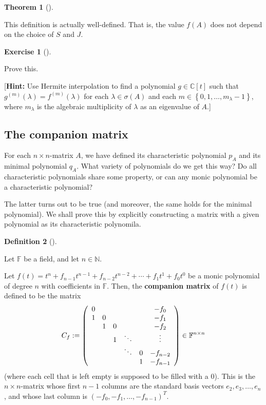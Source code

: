 \documentclass[numbers=enddot,12pt,final,onecolumn,notitlepage]{scrartcl}%
\newcounter{exer}
\numberwithin{exer}{subsection}
\theoremstyle{definition}
\newtheorem{theo}{Theorem}[subsection]
\newenvironment{theorem}[1][]
{\begin{theo}[#1]\begin{leftbar}}
{\end{leftbar}\end{theo}}
\newtheorem{defi}[theo]{Definition}
\newenvironment{definition}[1][]
{\begin{defi}[#1]\begin{leftbar}}
{\end{leftbar}\end{defi}}
\newtheorem{exmp}[exer]{Exercise}
\newenvironment{exercise}[1][]
{\begin{exmp}[#1]\begin{leftbar}}
{\end{leftbar}\end{exmp}}
\begin{document}
\begin{theorem}
This definition is actually well-defined. That is, the value $f\left(
A\right)  $ does not depend on the choice of $S$ and $J$.
\end{theorem}

\begin{exercise}
 Prove this.

[\textbf{Hint:} Use Hermite interpolation to find a polynomial $g\in
\mathbb{C}\left[  t\right]  $ such that $g^{\left(  m\right)  }\left(
\lambda\right)  =f^{\left(  m\right)  }\left(  \lambda\right)  $ for each
$\lambda\in\sigma\left(  A\right)  $ and each $m\in\left\{  0,1,\ldots
,m_{\lambda}-1\right\}  $, where $m_{\lambda}$ is the algebraic multiplicity
of $\lambda$ as an eigenvalue of $A$.]
\end{exercise}

\subsection{The companion matrix}

For each $n\times n$-matrix $A$, we have defined its characteristic polynomial
$p_{A}$ and its minimal polynomial $q_{A}$. What variety of polynomials do we
get this way? Do all characteristic polynomials share some property, or can
any monic polynomial be a characteristic polynomial?

The latter turns out to be true (and moreover, the same holds for the minimal
polynomial). We shall prove this by explicitly constructing a matrix with a
given polynomial as its characteristic polynomila.

\begin{definition}
\label{def.jnf.companion.Cf}Let $\mathbb{F}$ be a field, and let
$n\in\mathbb{N}$.

Let $f\left(  t\right)  =t^{n}+f_{n-1}t^{n-1}+f_{n-2}t^{n-2}+\cdots+f_{1}%
t^{1}+f_{0}t^{0}$ be a monic polynomial of degree $n$ with coefficients in
$\mathbb{F}$. Then, the \textbf{companion matrix} of $f\left(  t\right)  $ is
defined to be the matrix%
\[
C_{f}:=\left(
\begin{array}
[c]{cccccc}%
0 &  &  &  &  & -f_{0}\\
1 & 0 &  &  &  & -f_{1}\\
& 1 & 0 &  &  & -f_{2}\\
&  & 1 & \ddots &  & \vdots\\
&  &  & \ddots & 0 & -f_{n-2}\\
&  &  &  & 1 & -f_{n-1}%
\end{array}
\right)  \in\mathbb{F}^{n\times n}%
\]
(where each cell that is left empty is supposed to be filled with a $0$). This
is the $n\times n$-matrix whose first $n-1$ columns are the standard basis
vectors $e_{2},e_{3},\ldots,e_{n}$, and whose last column is $\left(
-f_{0},-f_{1},\ldots,-f_{n-1}\right)  ^{T}$.
\end{definition}
\end{document}
